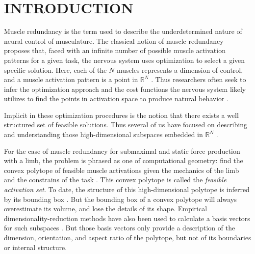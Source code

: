 
\section{INTRODUCTION}

Muscle redundancy is the term used to describe the underdetermined nature of neural control of musculature.
The classical notion of muscle redundancy  proposes that, faced with an infinite number of possible muscle activation patterns for a given task, the nervous system uses optimization to select a given specific solution.
Here, each of the $N$ muscles represents a dimension of control, and a muscle activation pattern is a point in $\mathbb{R}^N$ \cite{Valero-Cuevas1998Large}.
Thus researchers often seek to infer the optimization approach and the cost functions the nervous system likely utilizes to find the points in activation space to produce natural behavior \cite{Chao1978Graphical,Prilutsky2000Muscle,scott2004optimal,todorov2002optimal,crowninshield1981physiologically,higginson2005simulated}. 


Implicit in these optimization procedures is the notion that there exists a well structured set of feasible solutions. Thus several of us have focused on describing and understanding those high-dimensional subspaces  embedded in $\mathbb{R}^N$ \cite{kutch2011muscle,kutch2012challenges,sohn2013cat_bounding_box,Valero-Cuevas1998Large,Valero-Cuevas2015high-dimensional}.

For the case of muscle redundancy for submaximal and static force production with a limb,  the problem is phrased as one of computational geometry: find the convex polytope of feasible muscle activations given the mechanics of the limb and the constrains of the task \cite{avis1992Pivoting,Valero-Cuevas1998Large,Valero-Cuevas2009mathematical,Valero-Cuevas2015high-dimensional}.  This convex polytope is called the \emph{feasible activation set}. To date, the structure of this high-dimensional polytope is inferred by its bounding box  \cite{kutch2011muscle,sohn2013cat_bounding_box,Valero-Cuevas2015high-dimensional}.  But the bounding box of a convex polytope will always overestimate its volume, and lose the details of its shape.  Empirical dimensionality-reduction methods have also been used to calculate a basis vectors for such subspaces \cite{Clewley2008Estimating,davella2005shared,krishnamoorthy2003muscle}. But those basis  vectors only provide a description of the dimension, orientation, and aspect ratio of the polytope, but not of its boundaries or internal  structure.

